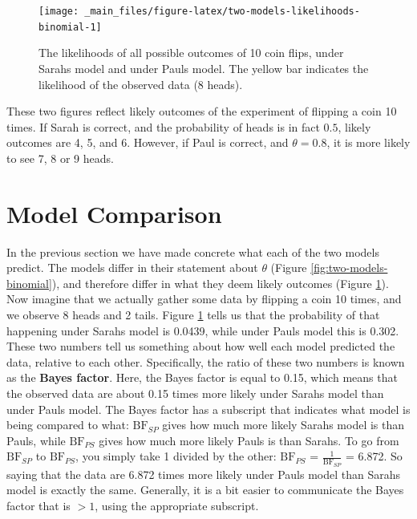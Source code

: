 \documentclass[
]{book}
\begin{document}
\begin{figure}

{\centering \texttt{[image: \_main\_files/figure-latex/two-models-likelihoods-binomial-1]} 

}

\caption{The likelihoods of all possible outcomes of 10 coin flips, under Sarahs model and under Pauls model. The yellow bar indicates the likelihood of the observed data (8 heads).}\label{fig:two-models-likelihoods-binomial}
\end{figure}

These two figures reflect likely outcomes of the experiment of flipping a coin 10 times. If Sarah is correct, and the probability of heads is in fact \(0.5\), likely outcomes are 4, 5, and 6. However, if Paul is correct, and \(\theta = 0.8\), it is more likely to see 7, 8 or 9 heads.

\hypertarget{model-comparison-section}{%
\section{Model Comparison}\label{model-comparison-section}}

In the previous section we have made concrete what each of the two models predict. The models differ in their statement about \(\theta\) (Figure \ref{fig:two-models-binomial}), and therefore differ in what they deem likely outcomes (Figure \ref{fig:two-models-likelihoods-binomial}). Now imagine that we actually gather some data by flipping a coin 10 times, and we observe 8 heads and 2 tails. Figure \ref{fig:two-models-likelihoods-binomial} tells us that the probability of that happening under Sarahs model is 0.0439, while under Pauls model this is 0.302. These two numbers tell us something about how well each model predicted the data, relative to each other. Specifically, the ratio of these two numbers is known as the \textbf{Bayes factor}. Here, the Bayes factor is equal to 0.15, which means that the observed data are about 0.15 times more likely under Sarahs model than under Pauls model.
The Bayes factor has a subscript that indicates what model is being compared to what: \(\text{BF}_{SP}\) gives how much more likely Sarahs model is than Pauls, while \(\text{BF}_{PS}\) gives how much more likely Pauls is than Sarahs. To go from \(\text{BF}_{SP}\) to \(\text{BF}_{PS}\), you simply take 1 divided by the other: \(\text{BF}_{PS}\) = \(\frac{1}{\text{BF}_{SP}}\) = 6.872. So saying that the data are 6.872 times more likely under Pauls model than Sarahs model is exactly the same. Generally, it is a bit easier to communicate the Bayes factor that is \(>1\), using the appropriate subscript.
\end{document}
